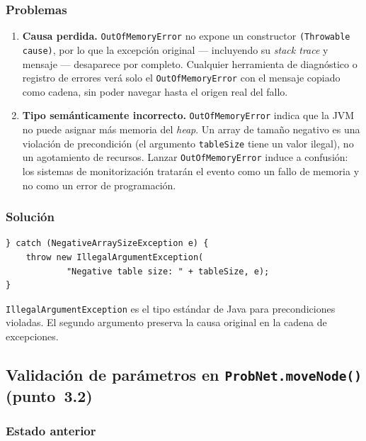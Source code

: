 \documentclass[11pt,a4paper]{article}
\newcommand{\code}[1]{\texttt{#1}}
\begin{document}
\subsubsection*{Problemas}

\begin{enumerate}[label=(\alph*)]
  \item \textbf{Causa perdida.} \code{OutOfMemoryError} no expone un
    constructor \code{(Throwable cause)}, por lo que la excepción
    original --- incluyendo su \emph{stack trace} y mensaje --- desaparece
    por completo. Cualquier herramienta de diagnóstico o registro de errores
    verá solo el \code{OutOfMemoryError} con el mensaje copiado como cadena,
    sin poder navegar hasta el origen real del fallo.

  \item \textbf{Tipo semánticamente incorrecto.} \code{OutOfMemoryError}
    indica que la JVM no puede asignar más memoria del \emph{heap}.
    Un array de tamaño negativo es una violación de precondición
    (el argumento \code{tableSize} tiene un valor ilegal), no un
    agotamiento de recursos. Lanzar \code{OutOfMemoryError} induce a
    confusión: los sistemas de monitorización tratarán el evento como
    un fallo de memoria y no como un error de programación.
\end{enumerate}

\subsubsection*{Solución}

\begin{lstlisting}
} catch (NegativeArraySizeException e) {
    throw new IllegalArgumentException(
            "Negative table size: " + tableSize, e);
}
\end{lstlisting}

\code{IllegalArgumentException} es el tipo estándar de Java para
precondiciones violadas. El segundo argumento preserva la causa original
en la cadena de excepciones.

\subsection{Validación de parámetros en \code{ProbNet.moveNode()}
            (punto~3.2)}

\subsubsection*{Estado anterior}
\end{document}
